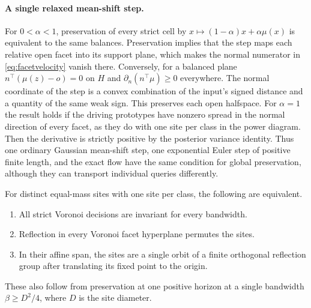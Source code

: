 \paragraph{A single relaxed mean-shift step.}
For $0<\alpha<1$, preservation of every strict cell by
$x\mapsto (1-\alpha)x+\alpha\mu(x)$ is equivalent to the same balances.
Preservation implies that the step maps each relative open facet into
its support plane, which makes the normal numerator in
\eqref{eq:facetvelocity} vanish there. Conversely, for a balanced plane
$n^\top(\mu(z)-o)=0$ on $H$ and $\partial_n(n^\top\mu)\ge0$ everywhere.
The normal coordinate of the step is a convex combination of the
input's signed distance and a quantity of the same weak sign.
This preserves each open halfspace. For $\alpha=1$ the result holds
if the driving prototypes have nonzero spread in the normal direction
of every facet, as they do with one site per class in the power diagram.
Then the derivative is strictly positive by the posterior variance
identity. Thus one ordinary Gaussian mean-shift step, one exponential
Euler step of positive finite length, and the exact flow have the same
condition for global preservation, although they can transport
individual queries differently.

\begin{corollary}
\label{cor:reflection}
For distinct equal-mass sites with one site per class, the following are
equivalent.
\begin{enumerate}
\item All strict Voronoi decisions are invariant for every bandwidth.
\item Reflection in every Voronoi facet hyperplane permutes the sites.
\item In their affine span, the sites are a single orbit of a finite
orthogonal reflection group after translating its fixed point to the
origin.
\end{enumerate}
These also follow from preservation at one positive horizon at a
single bandwidth $\beta\ge D^2/4$, where $D$ is the site diameter.
\end{corollary}

